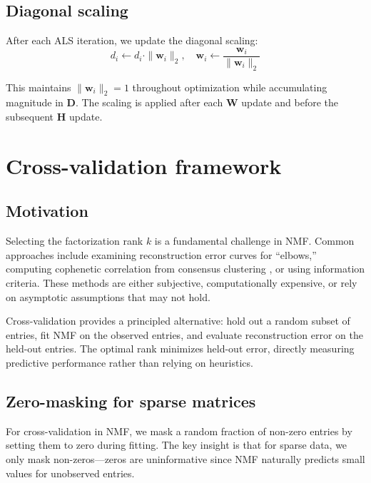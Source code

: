 \documentclass[11pt]{article}
\begin{document}
\subsection{Diagonal scaling}

After each ALS iteration, we update the diagonal scaling:
\begin{equation}
  d_i \leftarrow d_i \cdot \|\mathbf{w}_i\|_2, \quad 
  \mathbf{w}_i \leftarrow \frac{\mathbf{w}_i}{\|\mathbf{w}_i\|_2}
  \label{eq:scaling}
\end{equation}

This maintains $\|\mathbf{w}_i\|_2 = 1$ throughout optimization while 
accumulating magnitude in $\mathbf{D}$. The scaling is applied after each 
$\mathbf{W}$ update and before the subsequent $\mathbf{H}$ update.


\section{Cross-validation framework} \label{sec:crossvalidation}

\subsection{Motivation}

Selecting the factorization rank $k$ is a fundamental challenge in NMF. Common 
approaches include examining reconstruction error curves for ``elbows,'' 
computing cophenetic correlation from consensus clustering \citep{Brunet2004}, 
or using information criteria. These methods are either subjective, 
computationally expensive, or rely on asymptotic assumptions that may not hold.

Cross-validation provides a principled alternative: hold out a random subset of 
entries, fit NMF on the observed entries, and evaluate reconstruction error on 
the held-out entries. The optimal rank minimizes held-out error, directly 
measuring predictive performance rather than relying on heuristics.

\subsection{Zero-masking for sparse matrices}

For cross-validation in NMF, we mask a random fraction of non-zero entries by 
setting them to zero during fitting. The key insight is that for sparse data, 
we only mask non-zeros---zeros are uninformative since NMF naturally predicts 
small values for unobserved entries.
\end{document}
